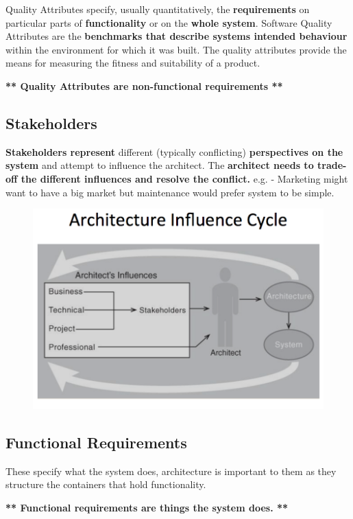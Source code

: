 \documentclass[a4paper]{article}
\begin{document}
Quality Attributes specify, usually quantitatively, the \textbf{requirements} on particular parts of \textbf{functionality} or on the \textbf{whole system}. Software Quality Attributes are the \textbf{benchmarks that describe systems intended behaviour} within the environment for which it was built. The quality attributes provide the means for measuring the fitness and suitability of a product.

\textbf{** Quality Attributes are non-functional requirements **}

\subsection{Stakeholders}
\textbf{Stakeholders represent} different (typically conflicting) \textbf{perspectives on the system} and attempt to influence the architect. The \textbf{architect needs to trade-off the different influences and resolve the conflict.} e.g. - Marketing might want to have a big market but maintenance would prefer system to be simple.

\begin{figure}[h]
\centering 
\includegraphics[scale=0.3]{aimages/influencecycle.png}
\end{figure}

\subsection{Functional Requirements}
These specify what the system does, architecture is important to them as they structure the containers that hold functionality. 

\textbf{** Functional requirements are things the system does. **}
\end{document}
